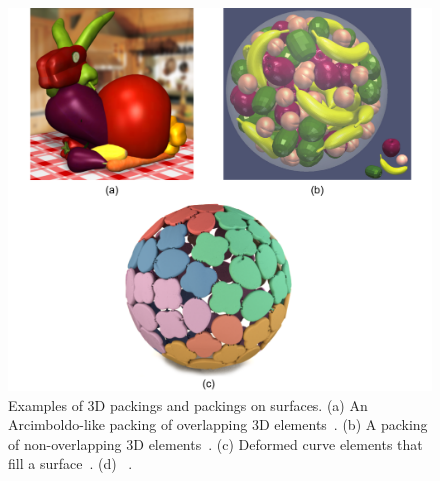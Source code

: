 

\begin{figure}
\centering
\includegraphics[width=1.0\textwidth]{figures/related/gal_ma_chen.pdf} 
\caption[Examples of 3D packings and packings on surfaces]
{\label{fig_related_gal_ma_chen} 
\newtext
{
Examples of 3D packings and packings on surfaces.
(a) An Arcimboldo-like packing of overlapping 3D elements~\cite{Gal2007B}. 
(b) A packing of non-overlapping 3D elements~\cite{Ma2018}.
(c) Deformed curve elements that fill a surface~\cite{Zehnder2016}.
(d) ~\cite{Chen2017}.
}
}
\end{figure}

